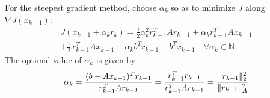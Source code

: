 \documentclass[12pt]{article}
\newcounter{lecture}
\theoremstyle{definition}
\theoremstyle{remark}
\numberwithin{equation}{section}
\newcommand{\N}{\mathbb{N}}
\DeclarePairedDelimiter{\norm}{\lVert}{\rVert}
\begin{document}
For the steepest gradient method, choose $\alpha_k$ so as to minimize $J$ along $\nabla J(x_{k-1})$:
\begin{multline*}
  J(x_{k-1} + \alpha_k r_k) = \frac{1}{2} \alpha_k^2 r_{k-1}^T A r_{k-1} + \alpha_k r_{k-1}^T A x_{k-1} \\+ \frac{1}{2} x_{k-1}^T A x_{k-1} -\alpha_k b^T r_{k-1} - b^T x_{k-1} \quad \forall \alpha_k \in \N
\end{multline*}
The optimal value of $\alpha_k$ is given by
\begin{equation*}
  \alpha_k = \frac{(b-Ax_{k-1})^T r_{k-1}}{r_{k-1}^T A r_{k-1}} = \frac{r_{k-1}^T r_{k-1}}{r_{k-1}^T A r_{k-1}} = \frac{\norm{r_{k-1}}_2^2}{\norm{r_{k-1}}_A^2}
\end{equation*}

\end{document}
